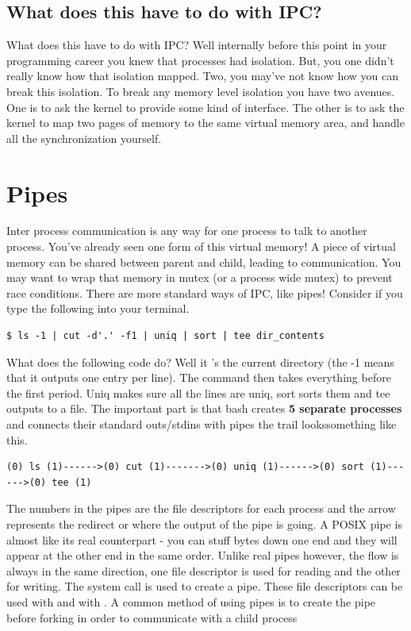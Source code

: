 \subsection{What does this have to do with IPC?}

What does this have to do with IPC?
Well internally before this point in your programming career you knew that processes had isolation.
But, you one didn't really know how that isolation mapped.
Two, you may've not know how you can break this isolation.
To break any memory level isolation you have two avenues.
One is to ask the kernel to provide some kind of interface.
The other is to ask the kernel to map two pages of memory to the same virtual memory area, and handle all the synchronization yourself.

\section{Pipes}

Inter process communication is any way for one process to talk to another process. You've already seen one form of this virtual memory! A piece of virtual memory can be shared between parent and child, leading to communication. You may want to wrap that memory in  mutex (or a process wide mutex) to prevent race conditions. There are more standard ways of IPC, like pipes! Consider if you type the following into your terminal.

\begin{verbatim}
$ ls -1 | cut -d'.' -f1 | uniq | sort | tee dir_contents
\end{verbatim}

What does the following code do? Well it 's the current directory (the -1 means that it outputs one entry per line). The  command then takes everything before the first period. Uniq makes sure all the lines are uniq, sort sorts them and tee outputs to a file. The important part is that bash creates \textbf{5 separate processes} and connects their standard outs/stdins with pipes the trail lookssomething like this.

\begin{verbatim}
(0) ls (1)------>(0) cut (1)------->(0) uniq (1)------>(0) sort (1)------>(0) tee (1)
\end{verbatim}

The numbers in the pipes are the file descriptors for each process and the arrow represents the redirect or where the output of the pipe is going. A POSIX pipe is almost like its real counterpart - you can stuff bytes down one end and they will appear at the other end in the same order. Unlike real pipes however, the flow is always in the same direction, one file descriptor is used for reading and the other for writing. The  system call is used to create a pipe. These file descriptors can be used with  and with . A common method of using pipes is to create the pipe before forking in order to communicate with a child process

